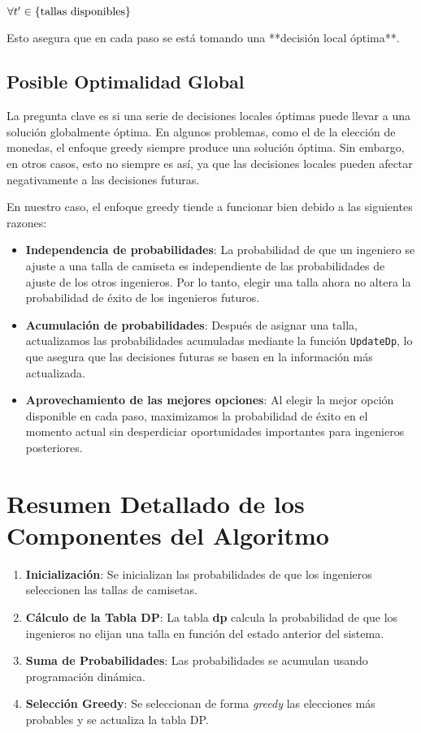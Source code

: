 \documentclass{article}
\begin{document}
$\forall t' \in \left\{ \textnormal{tallas disponibles} \right\}$



Esto asegura que en cada paso se está tomando una **decisión local óptima**.

\subsection*{Posible Optimalidad Global}

La pregunta clave es si una serie de decisiones locales óptimas puede llevar a una solución globalmente óptima. En algunos problemas, como el de la elección de monedas, el enfoque greedy siempre produce una solución óptima. Sin embargo, en otros casos, esto no siempre es así, ya que las decisiones locales pueden afectar negativamente a las decisiones futuras.

En nuestro caso, el enfoque greedy tiende a funcionar bien debido a las siguientes razones:

\begin{itemize}
    \item \textbf{Independencia de probabilidades}: La probabilidad de que un ingeniero se ajuste a una talla de camiseta es independiente de las probabilidades de ajuste de los otros ingenieros. Por lo tanto, elegir una talla ahora no altera la probabilidad de éxito de los ingenieros futuros.
    \item \textbf{Acumulación de probabilidades}: Después de asignar una talla, actualizamos las probabilidades acumuladas mediante la función \texttt{UpdateDp}, lo que asegura que las decisiones futuras se basen en la información más actualizada.
    \item \textbf{Aprovechamiento de las mejores opciones}: Al elegir la mejor opción disponible en cada paso, maximizamos la probabilidad de éxito en el momento actual sin desperdiciar oportunidades importantes para ingenieros posteriores.
\end{itemize}
\section*{Resumen Detallado de los Componentes del Algoritmo}

\begin{enumerate}
    \item \textbf{Inicialización}: Se inicializan las probabilidades de que los ingenieros seleccionen las tallas de camisetas.
    \item \textbf{Cálculo de la Tabla DP}: La tabla \textbf{dp} calcula la probabilidad de que los ingenieros no elijan una talla en función del estado anterior del sistema.
    \item \textbf{Suma de Probabilidades}: Las probabilidades se acumulan usando programación dinámica.
    \item \textbf{Selección Greedy}: Se seleccionan de forma \textit{greedy} las elecciones más probables y se actualiza la tabla DP.
\end{enumerate}
\end{document}
